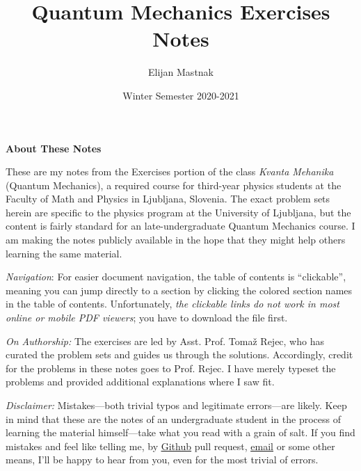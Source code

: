 \documentclass[11pt, a4paper]{article}
\begin{document}
\title{Quantum Mechanics Exercises Notes}
\author{Elijan Mastnak}
\date{Winter Semester 2020-2021}
\maketitle


\begin{center}
\textbf{About These Notes}
\end{center}

These are my notes from the Exercises portion of the class \textit{Kvanta Mehanika} (Quantum Mechanics), a required course for third-year physics students at the Faculty of Math and Physics in Ljubljana, Slovenia. The exact problem sets herein are specific to the physics program at the University of Ljubljana, but the content is fairly standard for an late-undergraduate Quantum Mechanics course. I am making the notes publicly available in the hope that they might help others learning the same material.

\vspace{2mm}
\textit{Navigation}: For easier document navigation, the table of contents is ``clickable'', meaning you can jump directly to a section by clicking the colored section names in the table of contents. Unfortunately, \textit{the clickable links do not work in most online or mobile PDF viewers}; you have to download the file first.

\vspace{2mm}
\textit{On Authorship:} 
The exercises are led by Asst. Prof. Toma\v{z} Rejec, who has curated the problem sets and guides us through the solutions. Accordingly, credit for the problems in these notes goes to Prof. Rejec. I have merely typeset the problems and provided additional explanations where I saw fit.

\vspace{2mm}
\textit{Disclaimer:} Mistakes---both trivial typos and legitimate errors---are likely. Keep in mind that these are the notes of an undergraduate student in the process of learning the material himself---take what you read with a grain of salt. If you find mistakes and feel like telling me, by \href{https://github.com/ejmastnak/fmf}{\underline{Github}} pull request, \href{mailto:ejmastnak@gmail.com}{\underline{email}} or some other means, I'll be happy to hear from you, even for the most trivial of errors.

\newpage

\tableofcontents

\newpage
\end{document}
